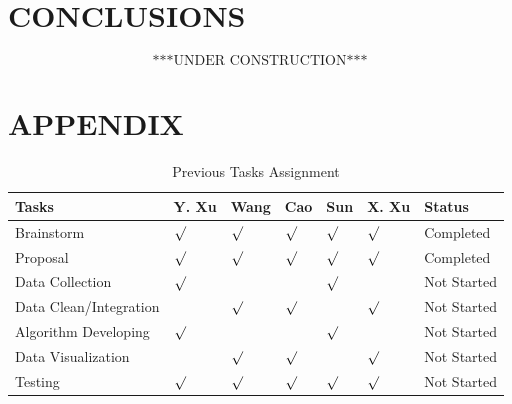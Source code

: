 \documentclass[letterpaper, 10 pt, conference]{ieeeconf}  %
\begin{document}
\section{CONCLUSIONS}

$$\text{***UNDER CONSTRUCTION***}$$

\addtolength{\textheight}{-12cm}   %







\section*{APPENDIX}
\begin{table}[ht]
\centering
\begin{tabular}{p{2cm} p{0.6cm} p{0.6cm} p{0.4cm} p{0.4cm} p{0.6cm} p{1.0cm}}
\hline
Tasks & Y. Xu & Wang & Cao & Sun & X. Xu & Status
 \\\hline
Brainstorm & $\surd$ & $\surd$ & $\surd$ & $\surd$ & $\surd$ & Completed\\
Proposal & $\surd$ & $\surd$ & $\surd$ & $\surd$ & $\surd$ & Completed\\
Data Collection & $\surd$ &  &  & $\surd$ &  & Not Started\\
Data Clean/Integration &  & $\surd$ & $\surd$ &  & $\surd$ & Not Started\\
Algorithm Developing & $\surd$ &  &  & $\surd$ &  & Not Started\\
Data Visualization &  & $\surd$ & $\surd$ &  & $\surd$ & Not Started\\
Testing & $\surd$ & $\surd$ & $\surd$ & $\surd$ & $\surd$ & Not Started\\
\hline
\end{tabular}
\caption{Previous Tasks Assignment}
\end{table}
\end{document}
